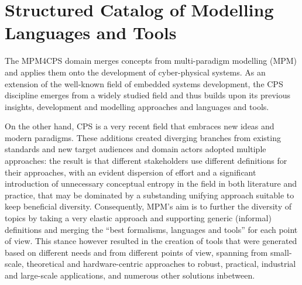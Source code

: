 \documentclass[final]{include/MPM4CPS/MPM4CPS-Report} %
\begin{document}

\chapter{Structured Catalog of Modelling Languages and Tools}
\label{ch:catalog}

The MPM4CPS domain merges concepts from multi-paradigm modelling (MPM) and applies them onto the development of cyber-physical systems.
As an extension of the well-known field of embedded systems development, the CPS discipline emerges from a widely studied field and thus builds upon its previous insights, development and modelling approaches and languages and tools.

On the other hand, CPS is a very recent field that embraces new ideas and modern paradigms.
These additions created diverging branches from existing standards and new target audiences and domain actors adopted multiple approaches: the result is that different stakeholders use different definitions for their approaches, with an evident dispersion of effort and a significant introduction of unnecessary conceptual entropy in the field in both literature and practice, that may be dominated by a substanding unifying approach suitable to keep beneficial diversity.
Consequently, MPM's aim is to further the diversity of topics by taking a very elastic approach and supporting generic (informal) definitions and merging the ``best formalisms, languages and tools'' for each point of view.
This stance however resulted in the creation of tools that were generated based on different
needs and from different points of view, spanning from small-scale, theoretical and hardware-centric  approaches to robust, practical, industrial and large-scale applications, and numerous other solutions inbetween.
\end{document}

